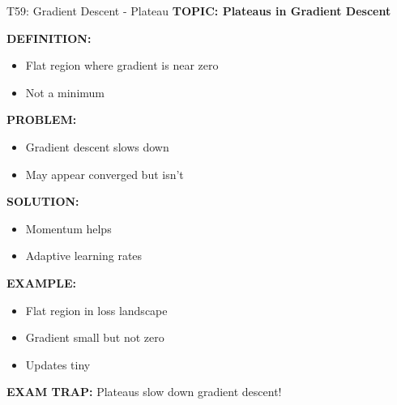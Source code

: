 \documentclass[8pt]{beamer}
\begin{document}
	\begin{frame}{T59: Gradient Descent - Plateau}
		\fontsize{6.5}{7.5}\selectfont
		\textbf{TOPIC: Plateaus in Gradient Descent}
		
		\vspace{0.1cm}
		\textbf{DEFINITION:}
		\begin{itemize}
			\item Flat region where gradient is near zero
			\item Not a minimum
		\end{itemize}
		
		\vspace{0.1cm}
		\textbf{PROBLEM:}
		\begin{itemize}
			\item Gradient descent slows down
			\item May appear converged but isn't
		\end{itemize}
		
		\vspace{0.1cm}
		\textbf{SOLUTION:}
		\begin{itemize}
			\item Momentum helps
			\item Adaptive learning rates
		\end{itemize}
		
		\vspace{0.1cm}
		\textbf{EXAMPLE:}
		\begin{itemize}
			\item Flat region in loss landscape
			\item Gradient small but not zero
			\item Updates tiny
		\end{itemize}
		
		\textcolor{myred}{\textbf{EXAM TRAP:}} Plateaus \textcolor{myblue}{slow down} gradient descent!
	\end{frame}
	
\end{document}
